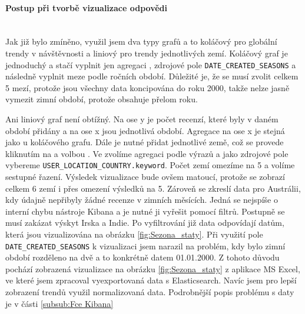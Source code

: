 \documentclass[czech,BP]{thesiskiv}
\begin{document}
\paragraph{Postup při tvorbě vizualizace odpovědi}
\mbox{}\\
Jak již bylo zmíněno, využil jsem dva typy grafů a to koláčový pro globální trendy v návštěvnosti a liniový pro trendy jednotlivých zemí. Koláčový graf je jednoduchý a stačí vyplnit jen agregaci , zdrojové pole \texttt{DATE\_CREATED\_SEASONS} a následně vyplnit meze podle ročních období. Důležité je, že se musí zvolit celkem 5 mezí, protože jsou všechny data koncipována do roku 2000, takže nelze jasně vymezit zimní období, protože obsahuje přelom roku.


Ani liniový graf není obtížný. Na ose y je počet recenzí, které byly v daném období přidány a na ose x jsou jednotlivá období. Agregace na ose x je stejná jako u koláčového grafu. Dále je nutné přidat jednotlivé země, což se provede kliknutím na  a volbou . Ve  zvolíme agregaci podle výrazů a jako zdrojové pole vybereme \texttt{USER\_LOCATION\_COUNTRY.keyword}. Počet zemí omezíme na 5 a volíme sestupné řazení. Výsledek vizualizace bude ovšem matoucí, protože se zobrazí celkem 6 zemí i přes omezení výsledků na 5. Zároveň se zkreslí data pro Austrálii, kdy údajně nepřibyly žádné recenze v zimních měsících. Jedná se nejspíše o interní chybu nástroje Kibana a je nutné ji vyřešit pomocí filtrů. Postupně se musí zakázat výskyt Irska a Indie. Po vyfiltrování již data odpovídají datům, která jsou vizualizována na obrázku \ref{fig:Sezona_staty}. Při využití pole \texttt{DATE\_CREATED\_SEASONS} k vizualizaci jsem narazil na problém, kdy bylo zimní období rozděleno na dvě a to konkrétně datem 01.01.2000. Z tohoto důvodu pochází zobrazená vizualizace na obrázku \ref{fig:Sezona_staty} z aplikace MS Excel, ve které jsem zpracoval vyexportovaná data s Elasticsearch. Navíc jsem pro lepší zobrazení trendů využil normalizovaná data. Podrobnější popis problému s daty je v části \ref{subsub:Fce Kibana}
\end{document}
